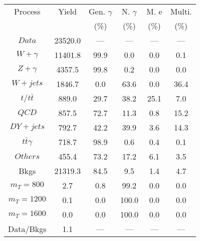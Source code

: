 \begin{figure}
\begin{minipage}[c]{0.32\textwidth}
\tiny{
\begin{tabular}{cccccc}
\hline
Process & Yield & Gen. $\gamma$ & N. $\gamma$ & M. e & Multi. \\
 &  & (\%) & (\%) & (\%) & (\%)  \\
\hline
                                                                      $ Data $ &  23520.0 &  --- &  --- &  --- &  ---\\
$ W+\gamma $ &  11401.8 &  99.9 &  0.0 &  0.0 &  0.1\\
$ Z+\gamma $ &  4357.5 &  99.8 &  0.2 &  0.0 &  0.0\\
$ W+jets $ &  1846.7 &  0.0 &  63.6 &  0.0 &  36.4\\
$ t/t\bar{t} $ &  889.0 &  29.7 &  38.2 &  25.1 &  7.0\\
$ QCD $ &  857.5 &  72.7 &  11.3 &  0.8 &  15.2\\
$ DY+jets $ &  792.7 &  42.2 &  39.9 &  3.6 &  14.3\\
$ t\bar{t}\gamma $ &  718.7 &  98.9 &  0.6 &  0.4 &  0.1\\
$ Others $ &  455.4 &  73.2 &  17.2 &  6.1 &  3.5\\
Bkgs &  21319.3 &  84.5 &  9.5 &  1.4 &  4.7\\
$ m_{T} = 800 $ &  2.7 &  0.8 &  99.2 &  0.0 &  0.0\\
$ m_{T} = 1200 $ &  0.1 &  0.0 &  100.0 &  0.0 &  0.0\\
$ m_{T} = 1600 $ &  0.0 &  0.0 &  100.0 &  0.0 &  0.0\\
Data/Bkgs &  1.1 &  --- &  --- &  --- &  ---\\
\hline
\end{tabular}
}
\end{minipage}
\end{figure}

